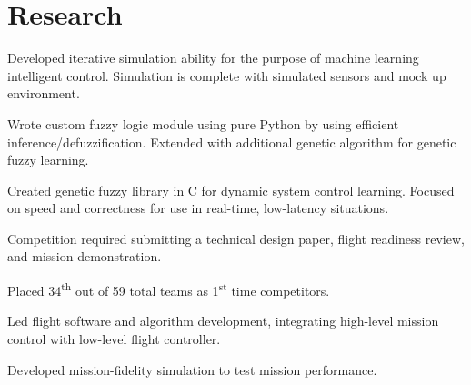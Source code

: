 \documentclass[letterpaper]{deedy-resume}
\begin{document}
\begin{minipage}[t]{\textwidth}
    \section{Research}
    \descript{}
    \begin{compactitem}
        \item Developed iterative simulation ability for the purpose of machine learning intelligent control.
            \subitem Simulation is complete with simulated sensors and mock up environment.
        \item Wrote custom fuzzy logic module using pure Python by using efficient inference/defuzzification.
            \subitem Extended with additional genetic algorithm for genetic fuzzy learning.
        \item Created genetic fuzzy library in C for dynamic system control learning.
            \subitem Focused on speed and correctness for use in real-time, low-latency situations.
    \end{compactitem}
    
    \vspace*{2ex}
    \descript{}
    \begin{compactitem}
        \item Competition required submitting a technical design paper, flight readiness review, and mission
            demonstration.
        \item Placed 34\textsuperscript{th} out of 59 total teams as 1\textsuperscript{st} time competitors.
        \item Led flight software and algorithm development, integrating high-level mission control with low-level
            flight controller.
        \item Developed mission-fidelity simulation to test mission performance.
    \end{compactitem}
    

\end{minipage}
\end{document}
